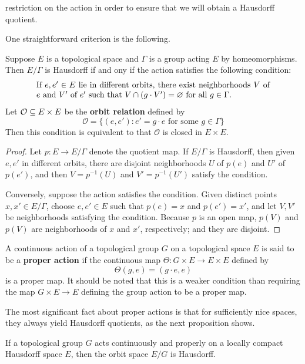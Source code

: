 restriction on the action in order to ensure that we will obtain a Hausdorff quotient.\par
One straightforward criterion is the following.
\begin{proposition}
Suppose $E$ is a topological space and $\Gamma$ is a group acting $E$ by homeomorphisms. Then $E/\Gamma$ is Hausdorff if and ony if the action satisfies the following condition:
\begin{equation*}
\parbox{\dimexpr\linewidth-6em}
{\strut
If $e,e'\in E$ lie in different orbits, there exist neighborhoods
$V$ of $e$ and $V'$ of $e'$ such that $V\cap(g\cdot V')=\emp$ for all $g\in\Gamma$.
\strut}
\end{equation*}
Let $\mathcal{O}\subseteq E\times E$ be the \textbf{orbit relation} defined by
\[\mathcal{O}=\{(e,e'):e'=g\cdot e\text{ for some }g\in\Gamma\}\]
Then this condition is equivalent to that $\mathcal{O}$ is closed in $E\times E$.
\end{proposition}
\begin{proof}
Let $p:E\to E/\Gamma$ denote the quotient map. If $E/\Gamma$ is Hausdorff, then given $e,e'$ in different orbits, there are disjoint neighborhoods $U$ of $p(e)$ and $U'$ of $p(e')$, and then $V=p^{-1}(U)$ and $V'=p^{-1}(U')$ satisfy the condition.\par
Conversely, suppose the action satisfies the condition. Given distinct points $x,x'\in E/\Gamma$, choose $e,e'\in E$ such that $p(e)=x$ and $p(e')=x'$, and let $V,V'$ be neighborhoods satisfying the condition. Because $p$ is an open map, $p(V)$ and $p(V)$ are neighborhoods of $x$ and $x'$, respectively; and they are disjoint.
\end{proof}
A continuous action of a topological group $G$ on a topological space $E$ is 
said to be a \textbf{proper action} if the continuous map $\varTheta:G\times E\to E\times E$ 
defined by
\begin{equation}\label{proper action def}
\varTheta(g,e)=(g\cdot e,e)
\end{equation}
is a proper map. It should be noted that this is a weaker condition than requiring the map 
$G\times E\to E$ defining the group action to be a proper map.\par
The most significant fact about proper actions is that for sufficiently nice spaces, they 
always yield Hausdorff quotients, as the next proposition shows.
\begin{proposition}\label{proper action Hausdorff}
If a topological group $G$ acts continuously and properly on a locally compact Hausdorff space $E$, then the orbit space $E/G$ is Hausdorff.
\end{proposition}
